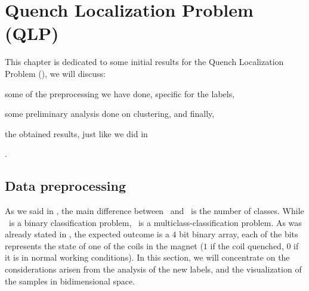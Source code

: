 \chapter{Quench Localization Problem (QLP)}
\label{chp:qlp}
This chapter is dedicated to some initial results for the Quench Localization Problem (\qlp), we will discuss:
\begin{inparaenum}[(i)]
	\item some of the preprocessing we have done, specific for the labels,
	\item some preliminary analysis done on clustering, and finally,
	\item the obtained results, just like we did in 
\end{inparaenum}.
\section{Data preprocessing}
\label{sec:qlp-preprocessing}
As we said in , the main difference between \qlp\ and \qrp\ is the number of
classes. While \qrp\ is a binary classification problem, \qlp\ is a multiclass-classification
problem. As was already stated in , the expected outcome is a $4$ bit binary
array, each of the bits represents the state of one of the coils in the magnet ($1$ if the coil
quenched, $0$ if it is in normal working conditions). In this section, we will concentrate on the
considerations arisen from the analysis of the new labels, and the visualization of the samples in
bidimensional space.

